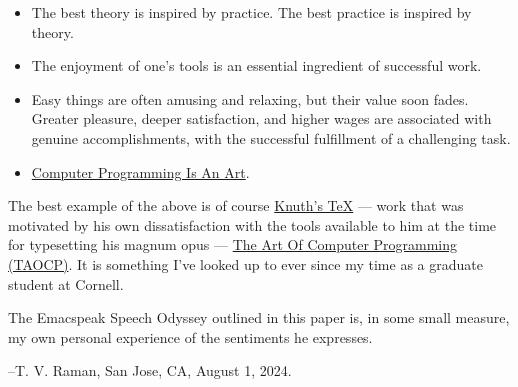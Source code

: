 \documentclass[11pt]{article}
\begin{document}
\begin{itemize}
\item The best theory is inspired by practice. The best practice is
inspired by theory.
\item The enjoyment of one's tools is an essential ingredient of
successful work.
\item Easy things are often amusing and relaxing, but their value soon
fades. Greater pleasure, deeper satisfaction, and higher wages are
associated with genuine accomplishments, with the successful
fulfillment of a challenging task.
\item \href{https://www.azquotes.com/author/8177-Donald\_Knuth}{Computer Programming Is An Art}.
\end{itemize}

The best example of the above is of course \href{https://en.wikipedia.org/wiki/TeX}{Knuth's \TeX{}} --- work that
    was motivated  by his own dissatisfaction with the tools available
    to him at the time for typesetting    his magnum opus --- \href{https://www-cs-faculty.stanford.edu/\~knuth/taocp.html}{The Art
    Of Computer Programming (TAOCP)}.  It is something I've looked up
    to ever since my time as a graduate student at Cornell.


The  Emacspeak Speech Odyssey outlined in this paper is, in some
small measure, my own personal
experience of the sentiments he expresses.

--T. V. Raman,  San Jose, CA, August 1, 2024.
\end{document}
